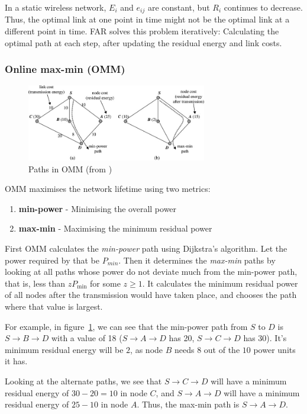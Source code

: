 \documentclass[conference]{IEEEtran}
\begin{document}
In a static wireless network, $E_{i}$ and $e_{ij}$ are constant, but $R_{i}$
continues to decrease. Thus, the optimal link at one point in time might not be the
optimal link at a different point in time. FAR solves this problem iteratively:
Calculating the optimal path at each step, after updating the residual energy
and link costs.

\subsubsection{Online max-min (OMM)}
\begin{figure}
\centering
\includegraphics[width=0.7\textwidth]{images/omm}
\caption{Paths in OMM (from \cite{alotaibi2012survey})}
\label{ommex}
\end{figure}

OMM \cite{li2001online} maximises the network lifetime using two metrics:
\begin{enumerate}
  \item \textbf{min-power} - Minimising the overall power
  \item \textbf{max-min} - Maximising the minimum residual power
\end{enumerate}

First OMM calculates the \textit{min-power} path using Dijkstra’s algorithm. Let
the power required by that be $P_{min}$.
Then it determines the \textit{max-min} paths by looking at all paths whose
power do not deviate much from the min-power path, that is, less than $zP_{\min}$
for some $z \ge 1$. It calculates the minimum residual power of all nodes
after the transmission would have taken place, and chooses the path where
that value is largest.

For example, in figure~\ref{ommex}, we can see that the min-power path from
$S$ to $D$ is $S \to B \to D$ with a value of 18 ($S \to A \to D$ has 20,
$S \to C \to D$ has 30).
It's minimum residual energy will be $2$, as node $B$ needs
$8$ out of the $10$ power units it has.

Looking at the alternate paths, we see that $S \to C \to D$ will have a
minimum residual energy of $30-20=10$ in node $C$, and $S \to A \to D$ will
have a minimum residual energy of $25-10$ in node $A$.
Thus, the max-min path is $S \to A \to D$.
\end{document}
